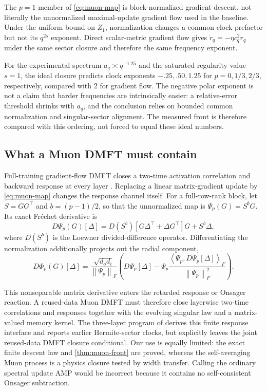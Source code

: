 \documentclass[11pt]{article}
\newcommand{\1}{\mathbf 1}
\newcommand{\ip}[2]{\left\langle #1,#2\right\rangle}
\newcommand{\norm}[1]{\left\lVert #1\right\rVert}
\theoremstyle{plain}
\theoremstyle{definition}
\begin{document}
The \(p=1\) member of \eqref{eq:muon-map} is block-normalized gradient
descent, not literally the unnormalized maximal-update gradient flow used in
the baseline.  Under the uniform bound on \(Z_1\), normalization changes a
common clock prefactor but not its \(q^{2s}\) exponent.  Direct scalar-metric
gradient flow gives \(\dot r_q=-\eta c_q^2r_q\) under the same sector closure
and therefore the same frequency exponent.

For the experimental spectrum $a_q\asymp q^{-1.25}$ and the saturated
regularity value $s=1$, the ideal closure predicts clock exponents
$-.25,.50,1.25$ for $p=0,1/3,2/3$, respectively, compared with $2$ for
gradient flow.  The negative polar exponent is not a claim that harder
frequencies are intrinsically easier: a relative-error threshold shrinks
with $a_q$, and the conclusion relies on bounded common normalization and
singular-sector alignment.  The measured front is therefore compared with
this ordering, not forced to equal these ideal numbers.

\subsection{What a Muon DMFT must contain}

Full-training gradient-flow DMFT closes a two-time activation correlation
and backward response at every layer \citep{bordelon2022dmft}.  Replacing a
linear matrix-gradient update by \eqref{eq:muon-map} changes the response
channel itself.  For a full-row-rank block, let
\(S=GG^\top\) and \(b=(p-1)/2\), so that the unnormalized map is
\(\Psi_p(G)=S^bG\).  Its exact Fr\'echet derivative is
\begin{equation}
 D\Psi_p(G)[\Delta]
 =D(S^b)[G\Delta^\top+\Delta G^\top]G+S^b\Delta,
 \label{eq:frechet-muon}
\end{equation}
where \(D(S^b)\) is the Loewner divided-difference operator.  Differentiating
the normalization additionally projects out the radial component,
\begin{equation}
 D\Phi_p(G)[\Delta]
 =\frac{\sqrt{d_od_i}}{\norm{\Psi_p}_F}
 \left(D\Psi_p[\Delta]
 -\Psi_p\frac{\ip{\Psi_p}{D\Psi_p[\Delta]}_F}
 {\norm{\Psi_p}_F^2}\right).
 \label{eq:frechet-normalized}
\end{equation}

This nonseparable matrix derivative enters the retarded response or Onsager
reaction.  A reused-data Muon DMFT must therefore close layerwise two-time
correlations and responses together with the evolving singular law and a
matrix-valued memory kernel.  The three-layer program of
\citet{aiad2026sequential} derives this finite response interface and reports
earlier Hermite-sector clocks, but explicitly leaves the joint reused-data
DMFT closure conditional.  Our use is equally limited: the exact finite
descent law and \cref{thm:muon-front} are proved, whereas the self-averaging
Muon process is a physics closure tested by width transfer.  Calling the
ordinary spectral update AMP would be incorrect because it contains no
self-consistent Onsager subtraction.
\end{document}
